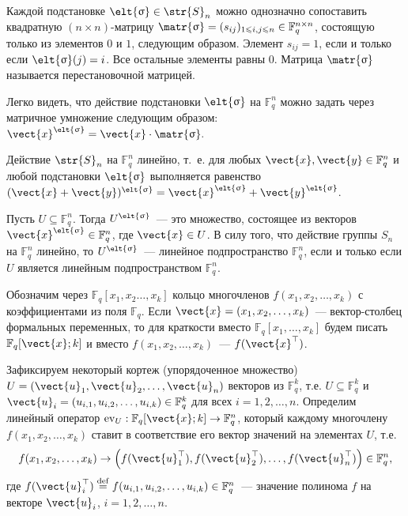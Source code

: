\documentclass[12pt]{extreport}
\begin{document}
Каждой подстановке \(\elt{\sigma}\in \str{S}_{n}\) можно однозначно сопоставить квадратную \((n\times n)\)-матрицу \(\matr{\sigma}=(s_{ij})_{1\le i,j\le n}\in \mathbb{F}^{n \times n}_{q}\), состоящую только из элементов \(0\) и \(1\), следующим образом.
Элемент \(s_{ij}=1\), если и только если \(\elt{\sigma}(j)=i\).
Все остальные элементы равны \(0\).
Матрица \(\matr{\sigma}\) называется перестановочной матрицей.

Легко видеть, что действие подстановки \(\elt{\sigma}\) на \(\mathbb{F}^n_q\) можно задать через матричное умножение следующим образом:
\(\vect{x}^{\elt{\sigma}}=\vect{x}\cdot \matr{\sigma}.\)

Действие \(\str{S}_{n}\) на \(\mathbb{F}^n_q\) линейно, т.~е. для любых \(\vect{x}, \vect{y}\in \mathbb{F}^n_q\) и любой подстановки \(\elt{\sigma}\) выполняется равенство \((\vect{x}+\vect{y})^{\elt{\sigma}}=\vect{x}^{\elt{\sigma}}+\vect{y}^{\elt{\sigma}}\).

Пусть \(U\subseteq \mathbb{F}^n_q\).
Тогда \(U^{\elt{\sigma}}\)~--- это множество, состоящее из векторов \(\vect{x}^{\elt{\sigma}}\in \mathbb{F}^n_q\), где \(\vect{x}\in U\).
В силу того, что действие группы \(S_n\) на \(\mathbb{F}^n_q\) линейно, то \(U^{\elt{\sigma}}\)~--- линейное подпространство \(\mathbb{F}^n_q\), если и только если \(U\) является линейным подпространством \(\mathbb{F}^n_q\).

Обозначим через \(\mathbb{F}_{q}[x_1,x_{2}\dotsc, x_{k}]\) кольцо многочленов \(f(x_1, x_2,\dotsc, x_{k})\) с коэффициентами из поля \(\mathbb{F}_{q}\).
Если \(\vect{x}=(x_1,x_2, \dotsc, x_{k})\)~--- вектор-столбец формальных переменных, то для краткости вместо \(\mathbb{F}_{q}[x_1,\dotsc, x_{k}]\) будем писать \(\mathbb{F}_{q}[\vect{x};k]\) и вместо \(f(x_1,x_2, \dotsc, x_k)\)~--- \(f(\vect{x}^{\top})\).

Зафиксируем некоторый кортеж (упорядоченное множество) \(U= \left(\vect{u}_1, \vect{u}_2, \dotsc, \vect{u}_{n}\right)\) векторов из \(\mathbb{F}^k_{q}\), т.е. \(U\subseteq \mathbb{F}^{k}_{q}\) и \(\vect{u}_i=(u_{i,1}, u_{i,2}, \dotsc, u_{i,k})\in \mathbb{F}^{k}_{q}\) для всех \(i=1,2, \dotsc, n\).
Определим линейный оператор \(\operatorname{ev}_{U}: \mathbb{F}_{q}[\vect{x};k] \rightarrow  \mathbb{F}^{n}_{q}\), который каждому многочлену \(f(x_1, x_2, \dotsc, x_{k})\) ставит в соответствие его вектор значений на элементах \(U\), т.е.
\[ f(x_1,x_2, \dotsc, x_k) \rightarrow \left(f(\vect{u}^{\top}_{1}), f(\vect{u}^{\top}_{2}), \dotsc, f(\vect{u}^{\top}_{n})\right)\in \mathbb{F}^{n}_{q}, \]
где \(f(\vect{u}^{\top}_i) \stackrel{\mathrm{def}}{=} f(u_{i,1}, u_{i,2}, \dotsc, u_{i,k})\in \mathbb{F}^{n}_{q}\)~--- значение полинома \(f\) на векторе \(\vect{u}_{i}\), \(i=1,2, \dotsc, n\).
\end{document}
